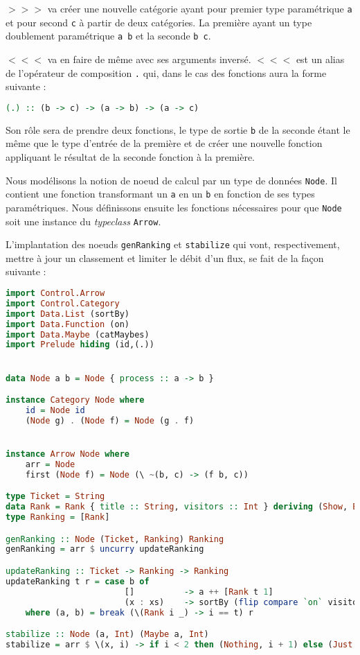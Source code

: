 \documentclass{llncs}
\begin{document}
$>>>$ va créer une nouvelle catégorie ayant pour premier type paramétrique
\texttt{a} et pour second \texttt{c} à partir de deux catégories.
La première ayant un type doublement paramétrique \texttt{a b} et la seconde
\texttt{b c}.

$<<<$ va en faire de même avec ses arguments inversé.
$<<<$ est un alias de l'opérateur de composition \texttt{.} qui, dans le cas
des fonctions aura la forme suivante :
\begin{lstlisting}[language=haskell]
(.) :: (b -> c) -> (a -> b) -> (a -> c)
\end{lstlisting}
Son rôle sera de prendre deux fonctions, le type de sortie \texttt{b} de la seconde
étant le même que le type d'entrée de la première et de créer une nouvelle fonction
appliquant le résultat de la seconde fonction à la première.

Nous modélisons la notion de noeud de calcul par un type de données
\texttt{Node}.
Il contient une fonction transformant un \texttt{a} en un \texttt{b} en fonction
de ses types paramétriques.
Nous définissons ensuite les fonctions nécessaires pour que \texttt{Node} soit
une instance du \emph{typeclass} \texttt{Arrow}.

L'implantation des noeuds \texttt{genRanking} et \texttt{stabilize} qui vont,
respectivement, mettre à jour un classement et limiter le débit d'un flux,
se fait de la façon suivante :
\begin{lstlisting}[language=haskell]
import Control.Arrow
import Control.Category
import Data.List (sortBy)
import Data.Function (on)
import Data.Maybe (catMaybes)
import Prelude hiding (id,(.))


data Node a b = Node { process :: a -> b }

instance Category Node where
    id = Node id
    (Node g) . (Node f) = Node (g . f)


instance Arrow Node where
    arr = Node
    first (Node f) = Node (\ ~(b, c) -> (f b, c))

type Ticket = String
data Rank = Rank { title :: String, visitors :: Int } deriving (Show, Eq)
type Ranking = [Rank]

genRanking :: Node (Ticket, Ranking) Ranking
genRanking = arr $ uncurry updateRanking

updateRanking :: Ticket -> Ranking -> Ranking
updateRanking t r = case b of
                        []          -> a ++ [Rank t 1]
                        (x : xs)    -> sortBy (flip compare `on` visitors) (Rank t (1 + visitors x) : a ++ xs)
    where (a, b) = break (\(Rank i _) -> i == t) r

stabilize :: Node (a, Int) (Maybe a, Int)
stabilize = arr $ \(x, i) -> if i < 2 then (Nothing, i + 1) else (Just x, 0)
\end{lstlisting}
\end{document}
